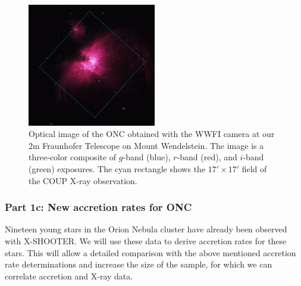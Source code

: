 \documentclass[10pt,fleqn,twoside]{article}
\begin{document}
\begin{figure} %
\centering
\includegraphics[width=0.5\textwidth]{onc-coupfield-2.ps}
\caption{Optical image of the ONC obtained with the WWFI camera
at our 2m Fraunhofer Telescope on Mount Wendelstein.
The image is a three-color composite of $g$-band (blue), $r$-band
(red), and $i$-band (green) exposures.
The cyan rectangle shows the $17' \times 17'$
field of the COUP X-ray observation.
\label{onc-wwfi.fig}}
\end{figure} %




\bigskip

\subsubsection*{Part 1c: New accretion rates for ONC}


Nineteen young stars in the Orion Nebula cluster have already been
observed with X-SHOOTER.
We will use these data to derive accretion rates for these stars.
This will allow a detailed comparison with the above mentioned accretion rate
determinations and increase the size of the sample, for which we
can correlate accretion and X-ray data.
\medskip
\end{document}
